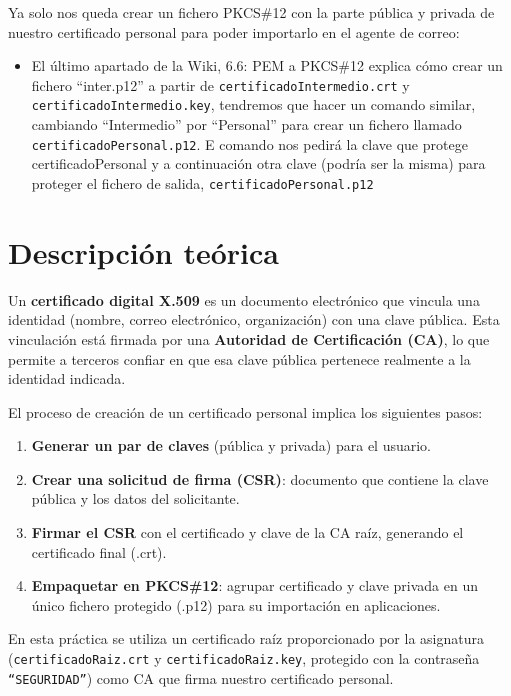 Ya solo nos queda crear un fichero PKCS\#12 con la parte pública y privada de nuestro certificado personal
para poder importarlo en el agente de correo:

\begin{itemize}
    \item[e)] El último apartado de la Wiki, 6.6: PEM a PKCS\#12 explica cómo crear un fichero ``inter.p12'' a
    partir de \texttt{certificadoIntermedio.crt} y \texttt{certificadoIntermedio.key}, tendremos que hacer un comando
    similar, cambiando ``Intermedio'' por ``Personal'' para crear un fichero llamado
    \texttt{certificadoPersonal.p12}. E comando nos pedirá la clave que protege
    certificadoPersonal y a continuación otra clave (podría ser la misma) para proteger el fichero de
    salida, \texttt{certificadoPersonal.p12}
\end{itemize}

\section{Descripción teórica}

Un \textbf{certificado digital X.509} es un documento electrónico que vincula una identidad
 (nombre, correo electrónico, organización) con una clave pública. Esta vinculación está firmada por una 
 \textbf{Autoridad de Certificación (CA)}, lo que permite a terceros confiar en que esa clave pública pertenece 
 realmente a la identidad indicada.

El proceso de creación de un certificado personal implica los siguientes pasos:

\begin{enumerate}
    \item \textbf{Generar un par de claves} (pública y privada) para el usuario.
    \item \textbf{Crear una solicitud de firma (CSR)}: documento que contiene la clave pública y los datos del solicitante.
    \item \textbf{Firmar el CSR} con el certificado y clave de la CA raíz, generando el certificado final (.crt).
    \item \textbf{Empaquetar en PKCS\#12}: agrupar certificado y clave privada en un único fichero protegido (.p12) para su importación en aplicaciones.
\end{enumerate}

En esta práctica se utiliza un certificado raíz proporcionado por la asignatura (\texttt{certificadoRaiz.crt} 
y \texttt{certificadoRaiz.key}, protegido con la contraseña \texttt{``SEGURIDAD''}) 
como CA que firma nuestro certificado personal.

